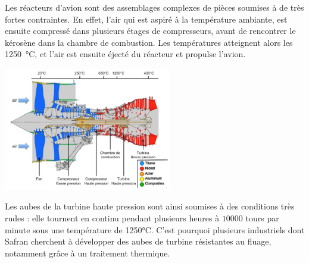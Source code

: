 
Les réacteurs d'avion sont des assemblages complexes de pièces soumises à de
très fortes contraintes. En effet, l'air qui est aspiré à la température 
ambiante, est ensuite compressé dans plusieurs étages de compresseurs, 
avant de rencontrer le kérosène dans la chambre de combustion. Les températures
atteignent alors les \SI{1250}{\celsius}, et l'air est ensuite éjecté du réacteur
et propulse l'avion.


\centerline{\includegraphics[width=0.55\textwidth]{images/coupe_CFM56.png}}


Les aubes de la turbine haute pression sont ainsi soumises à des conditions très rudes : elle tournent en continu pendant plusieurs heures à $10000$ tours par minute sous une température de 1250°C. C'est pourquoi plusieurs industriels dont Safran cherchent à développer des aubes de turbine résistantes au fluage, notamment grâce à un traitement thermique.


